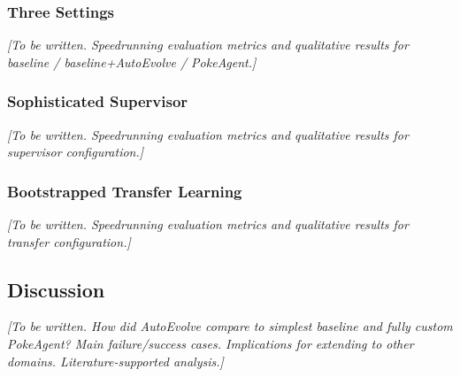 \subsubsection{Three Settings}\label{sec:three_settings_results}

\textit{[To be written. Speedrunning evaluation metrics and qualitative results for baseline / baseline+AutoEvolve / PokeAgent.]}

\subsubsection{Sophisticated Supervisor}\label{sec:supervisor_results}

\textit{[To be written. Speedrunning evaluation metrics and qualitative results for supervisor configuration.]}

\subsubsection{Bootstrapped Transfer Learning}\label{sec:transfer_results}

\textit{[To be written. Speedrunning evaluation metrics and qualitative results for transfer configuration.]}

\subsection{Discussion}\label{sec:autoevolve_discussion}

\textit{[To be written. How did AutoEvolve compare to simplest baseline and fully custom PokeAgent? Main failure/success cases. Implications for extending to other domains. Literature-supported analysis.]}
